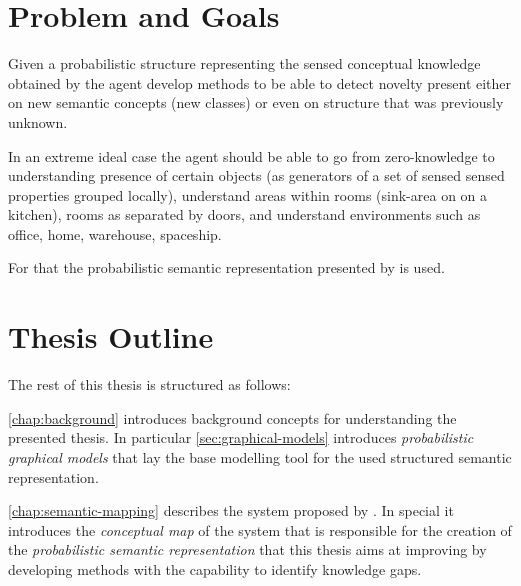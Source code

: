 \section{Problem and Goals}
%
Given a probabilistic structure representing the sensed conceptual knowledge
obtained by the agent develop methods to be able to detect novelty present
either on new semantic concepts (new classes) or even on structure that was
previously unknown.


In an extreme ideal case the agent should be able to go from zero-knowledge to
understanding presence of certain objects (as generators of a set of sensed
sensed properties grouped locally), understand areas within rooms (sink-area on
on a kitchen), rooms as separated by doors, and understand environments such
as office, home, warehouse, spaceship.


For that the probabilistic semantic representation presented by
\cite{andrzej2011phd} is used.

%



\section{Thesis Outline}
The rest of this thesis is structured as follows:

\autoref{chap:background} introduces background concepts for understanding the
presented thesis. In particular \autoref{sec:graphical-models} introduces
\emph{probabilistic graphical models} that lay the base modelling tool for
the used structured semantic representation.

\autoref{chap:semantic-mapping} describes the system proposed by
\cite{andrzej}. In special it introduces the \emph{conceptual map} of the system
that is responsible for the creation of the \emph{probabilistic semantic
representation} that this thesis aims at improving by developing methods with
the capability to identify knowledge gaps.

